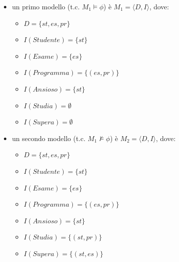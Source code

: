 \documentclass[12pt]{article}
\begin{document}
\begin{itemize}
    \item un primo modello (t.c. $M_1 \models \phi$) è $M_1 = \langle D, I \rangle$, dove:
\begin{itemize}
    \item $D = \{ st, es, pr \}$
    \item $I(Studente) = \{ st \}$
    \item $I(Esame) = \{ es \}$
    \item $I(Programma) = \{ (es, pr) \}$
    \item $I(Ansioso) = \{ st \}$
    \item $I(Studia) = \emptyset$ 
    \item $I(Supera) = \emptyset$
\end{itemize}

\item un secondo modello (t.c. $M_1 \not\models \phi$) è $M_2 = \langle D, I \rangle$, dove:  

\begin{itemize}
    \item $D = \{ st, es, pr \}$
\item $I(Studente) = \{ st \}$
\item $I(Esame) = \{ es \}$
\item $I(Programma) = \{ (es, pr) \}$
\item $I(Ansioso) = \{ st \}$
\item $I(Studia) = \{ (st, pr)  \}$
\item $I(Supera) = \{ (st, es) \}$
\end{itemize}

\end{itemize}
\end{document}

